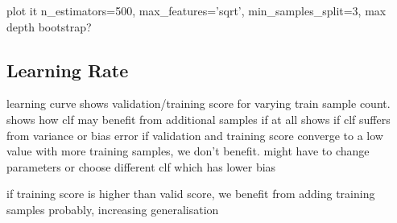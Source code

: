 plot it
            n_estimators=500,
            max_features='sqrt',
            min_samples_split=3,
            max depth
            bootstrap?

\subsection{Learning Rate}
learning curve
shows validation/training score for varying train sample count.
shows how clf may benefit from additional samples if at all
shows if clf suffers from variance or bias error
if validation and training score converge to a low value with more training samples,
we don't benefit. might have to change parameters or choose different clf which
has lower bias

if training score is higher than valid score, we benefit from adding training
samples probably, increasing generalisation


